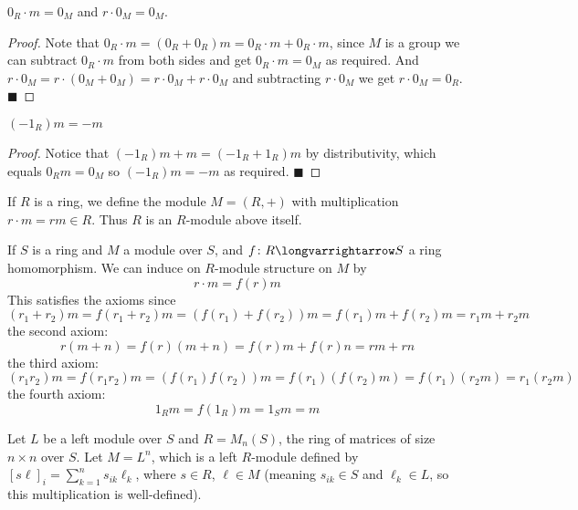 \documentclass[10pt]{article}
\let\longto=\longvarrightarrow
\def\qed{\hskip1cm\hbox{}\hfill$\blacksquare$}
\begin{document}
\begin{prop*}

    $0_R\cdot m=0_M$ and $r\cdot0_M=0_M$.

\end{prop*}

\begin{proof}

    Note that $0_R\cdot m=(0_R+0_R)m=0_R\cdot m+0_R\cdot m$, since $M$ is a group we can subtract $0_R\cdot m$ from both sides and get $0_R\cdot m=0_M$ as required.
    And $r\cdot0_M=r\cdot(0_M+0_M)=r\cdot0_M+r\cdot0_M$ and subtracting $r\cdot0_M$ we get $r\cdot0_M=0_R$.
    \qed

\end{proof}

\begin{prop*}

    $(-1_R)m=-m$

\end{prop*}

\begin{proof}

    Notice that $(-1_R)m+m=(-1_R+1_R)m$ by distributivity, which equals $0_Rm=0_M$ so $(-1_R)m=-m$ as required.
    \qed

\end{proof}

\begin{exam*}

    \benum
        \item If $R$ is a ring, we define the module $M=(R,+)$ with multiplication $r\cdot m=rm\in R$.
        Thus $R$ is an $R$-module above itself.

        \item If $S$ is a ring and $M$ a module over $S$, and $f\colon R\longto S$ a ring homomorphism.
            We can induce on $R$-module structure on $M$ by
            \[ r\cdot m = f(r)m \]
            This satisfies the axioms since
            \[ (r_1+r_2)m = f(r_1+r_2)m = (f(r_1)+f(r_2))m = f(r_1)m+f(r_2)m = r_1m+r_2m \]
            the second axiom:
            \[ r(m+n) = f(r)(m+n) = f(r)m + f(r)n = rm+rn \]
            the third axiom:
            \[ (r_1r_2)m = f(r_1r_2)m = (f(r_1)f(r_2))m = f(r_1)(f(r_2)m) = f(r_1)(r_2m) = r_1(r_2m) \]
            the fourth axiom:
            \[ 1_Rm = f(1_R)m = 1_Sm = m \]

        \item Let $L$ be a left module over $S$ and $R=M_n(S)$, the ring of matrices of size $n\times n$ over $S$.
            Let $M=L^n$, which is a left $R$-module defined by $[s\ell]_i = \sum_{k=1}^n s_{ik}\ell_k$, where $s\in R$, $\ell\in M$ (meaning $s_{ik}\in S$ and $\ell_k\in L$, so this multiplication is
            well-defined).
    \eenum

\end{exam*}
\end{document}
